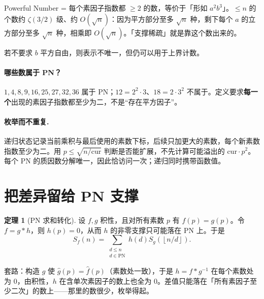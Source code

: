 \documentclass[UTF8,a4paper,11pt,twoside,openright,fontset=fandol]{ctexbook}
\theoremstyle{definition}
\newtheorem{theorem}[definition]{定理}
\newcommand{\floor}[1]{\left\lfloor #1\right\rfloor}
\begin{document}
\begin{tip}
Powerful Number = 每个素因子指数都 $\ge2$ 的数，等价于「形如 $a^2b^3$」。$\le n$ 的个数约 $\zeta(3/2)$ 级、约 $O(\sqrt n)$：因为平方部分至多 $\sqrt n$ 种，剩下每个 $a$ 的立方部分至多 $\sqrt n$ 种，相乘即 $O(\sqrt n)$。「支撑稀疏」就是靠这个数出来的。
\end{tip}

若不要求 $b$ 平方自由，则表示不唯一，但仍可以用于上界计数。


\paragraph{哪些数属于 PN？}
$1,4,8,9,16,25,27,32,36$ 属于 PN；$12=2^2\cdot3$、$18=2\cdot3^2$ 不属于。定义要求\textbf{每一个}出现的素因子指数都至少为二，不是“存在平方因子”。
\paragraph{枚举而不重复.} 递归状态记录当前乘积与最后使用的素数下标，后续只加更大的素数，每个新素数指数至少为二。用 $p\le\sqrt{n/\text{cur}}$ 判断是否能扩展，不先计算可能溢出的 $\text{cur}\cdot p^2$。每个 PN 的质因数分解唯一，因此恰访问一次；递归同时携带函数值。


\section{把差异留给 PN 支撑}
\begin{theorem}[PN 求和转化]
设 $f,g$ 积性，且对所有素数 $p$ 有 $f(p)=g(p)$。令 $f=g*h$，则 $h(p)=0$，从而 $h$ 的非零支撑只可能落在 PN 上。于是
\[
 S_f(n)=\sum_{\substack{d\le n\\d\in\mathrm{PN}}}h(d)S_g(\floor{n/d}).
\]
\end{theorem}

\begin{tip}
套路：构造 $g$ 使 $\hat g(p)=\hat f(p)$（素数处一致），于是 $h=f*g^{-1}$ 在每个素数处为 $0$，由积性，$h$ 在含单次素因子的数上也全为 $0$。差值只能落在「所有素因子至少二次」的数上——那里的数很少，枚举得起。
\end{tip}
\end{document}
